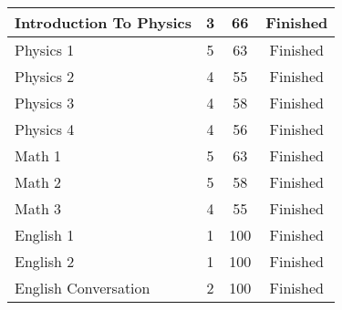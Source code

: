 \documentclass[12pt,letterpaper]{article}
\begin{document}
\begin{center}
\begin{tabular}{ | l | c | c | c |}
	Introduction To Physics & 3 & 66 & Finished \\ \hline
	Physics 1 & 5 & 63 & Finished \\ \hline
	Physics 2  & 4 & 55 & Finished \\ \hline
	Physics 3 & 4 & 58 & Finished \\ \hline
	Physics 4 & 4 & 56 & Finished \\ \hline \hline

	Math 1 & 5 & 63 & Finished \\ \hline
	Math 2  & 5 & 58 & Finished \\ \hline
	Math 3 & 4 & 55 & Finished \\ \hline \hline

	English 1 & 1 & 100 & Finished \\ \hline
	English 2 & 1 & 100 & Finished \\ \hline
	English Conversation & 2 & 100 & Finished \\
    \hline
    \end{tabular}
\end{center}
\end{document}
